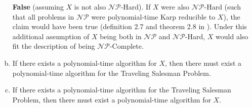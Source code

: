 \documentclass{scrartcl}
\begin{document}
\begin{flushleft}
\begin{enumerate}[(a)]
            \bigskip
            \textbf{False} (assuming $X$ is not also $\mathcal{NP}$-Hard). If $X$ were also
            $\mathcal{NP}$-Hard (such that all problems in $\mathcal{NP}$ were polynomial-time Karp
            reducible to $X$), the claim would have been true (definition 2.7 and theorem 2.8 in
            \cite{modernapp}). Under this additional assumption of $X$ being both in $\mathcal{NP}$
            and $\mathcal{NP}$-Hard, $X$ would also fit the description of being
            $\mathcal{NP}$-Complete.
        \item If there exists a polynomial-time algorithm for $X$, then there must exist a
            polynomial-time algorithm for the Traveling Salesman Problem.
        \item If there exists a polynomial-time algorithm for the Traveling Salesman Problem, then
            there must exist a polynomial-time algorithm for $X$.
    \end{enumerate}

    
    
\end{flushleft}
\end{document}
